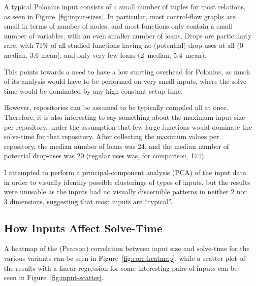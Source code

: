 \documentclass[11pt,a4paper,twoside,openany]{report}
\begin{document}
A typical Polonius input consists of a small number of tuples for most
relations, as seen in Figure~\ref{fig:input-sizes}. In particular, most
control-flow graphs are small in terms of number of nodes, and most functions
only contain a small number of variables, with an even smaller number of loans.
Drops are particularly rare, with 71\% of all studied functions having no
(potential) drop-uses at all (0 median, 3.6 mean), and only very few loans
(2~median, 5.4~mean).

This points towards a need to have a low starting overhead for Polonius, as
much of its analysis would have to be performed on very small inputs, where the
solve-time would be dominated by any high constant setup time.

However, repositories can be assumed to be typically compiled all at once.
Therefore, it is also interesting to say something about the maximum input size
per repository, under the assumption that few large functions would dominate the
solve-time for that repository. After collecting the maximum values per repository,
the median number of loans was 24, and the median number of potential drop-uses
was 20 (regular uses was, for comparison, 174).

I attempted to perform a principal-component analysis (PCA) of the input data in
order to visually identify possible clusterings of types of inputs, but the
results were unusable as the inputs had no visually discernible patterns in
neither 2 nor 3 dimensions, suggesting that most inputs are ``typical''.

\subsection{How Inputs Affect Solve-Time}\label{sec:inputs:correlation}

A heatmap of the (Pearson) correlation between input size and solve-time for the
various variants can be seen in Figure~\ref{fig:corr-heatmap}, while a scatter
plot of the results with a linear regression for some interesting pairs of
inputs can be seen in Figure~\ref{fig:input-scatter}.
\end{document}
